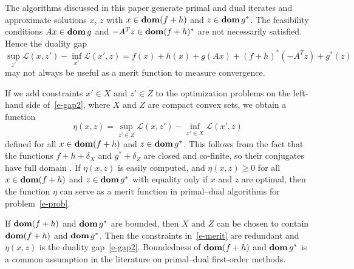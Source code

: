 \documentclass[letterpaper,11pt]{article}
\newcommand{\BEQ}{\begin{equation}}
\newcommand{\EEQ}{\end{equation}}
\newcommand{\dom}{\mathop{\bf dom}}
\newcommand{\cL}{\mathcal L}
\begin{document}
The algorithms discussed in this paper generate primal and dual iterates 
and approximate solutions $x$, $z$ with 
$x \in \dom (f+h)$ and $z\in \dom g^*$.
The feasibility conditions $Ax \in \dom g$
and $-A^Tz \in \dom (f+h)^*$ are not necessarily satisfied.
Hence the duality gap
\BEQ \label{e-gap2}
\sup_{z'} \cL(x, z') - \inf_{x'} \cL(x', z) 
 =  f(x) + h(x) + g(Ax) + (f+h)^*(-A^Tz) + g^*(z)
\EEQ
may not always be useful as a merit function to measure convergence. 

If we add constraints $x'\in X$ and $z'\in Z$ to the optimization
problems on the left-hand side of~\eqref{e-gap2},
where $X$ and $Z$ are compact convex sets, we obtain a function
\BEQ \label{e-merit}
\eta(x,z) = \sup_{z'\in Z} \cL(x, z') - \inf_{x'\in X} \cL(x', z) 
\EEQ
defined for all $x\in\dom(f+h)$ and $z\in\dom g^*$.
This follows from the fact that the functions $f+h+\delta_X$ and
$g^*+\delta_Z$ are closed and co-finite, so their conjugates
have full domain \cite[Corollary 13.3.1]{Roc:70}. 
If $\eta(x,z)$ is easily computed, and $\eta(x,z) \geq 0$ for all 
$x\in \dom(f+h)$ and $z\in\dom g^*$ with equality only if 
$x$ and $z$ are optimal, then the function $\eta$
can serve as a merit function in primal--dual algorithms
for problem~\eqref{e-prob}.

If $\dom(f+h)$ and $\dom g^*$ are bounded,
then $X$ and $Z$ can be chosen to contain $\dom (f+h)$ and $\dom g^*$.
Then the constraints in~\eqref{e-merit} are redundant and $\eta(x,z)$
is the duality gap~\eqref{e-gap2}.
Boundedness of $\dom(f+h)$ and $\dom g^*$ is a common
assumption in the literature on primal--dual first-order methods.
\end{document}
